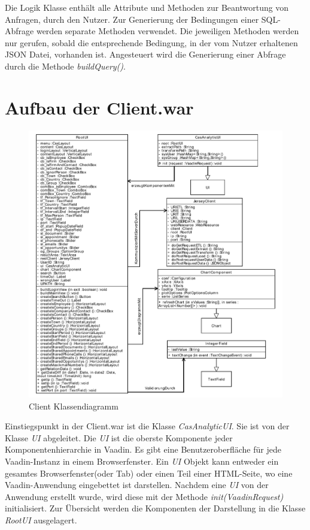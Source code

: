 Die Logik Klasse enthält alle Attribute und Methoden zur Beantwortung von Anfragen, durch den Nutzer. Zur Generierung der Bedingungen einer SQL-Abfrage werden separate Methoden verwendet. Die jeweiligen Methoden werden nur gerufen, sobald die entsprechende Bedingung, in der vom Nutzer erhaltenen JSON Datei, vorhanden ist. Angesteuert wird die Generierung einer Abfrage durch die Methode \textit{buildQuery()}. 

\section{Aufbau der Client.war}
\label{ch:Umsetzung:sec:clientwar}

\begin{figure}[htbp]
\begin{center}
\includegraphics[width=1.0\textwidth]{pics/ClientKlassendiagramm.pdf}
\caption{Client Klassendiagramm}
\label{umsetzung_klassendiagramm_client}
\end{center}
\end{figure}

Einstiegspunkt in der Client.war ist die Klasse \textit{CasAnalyticUI}. Sie ist von der Klasse \textit{UI} abgeleitet. Die \textit{UI} ist die oberste Komponente jeder Komponentenhierarchie in Vaadin. Es gibt eine Benutzeroberfläche für jede Vaadin-Instanz in einem Browserfenster. Ein \textit{UI} Objekt kann entweder ein gesamtes Browserfenster(oder Tab) oder einen Teil einer HTML-Seite, wo eine Vaadin-Anwendung eingebettet ist darstellen. Nachdem eine \textit{UI} von der Anwendung erstellt wurde, wird diese mit der Methode \textit{init(VaadinRequest)} initialisiert. Zur Übersicht werden die Komponenten der Darstellung in die Klasse \textit{RootUI} ausgelagert. 

